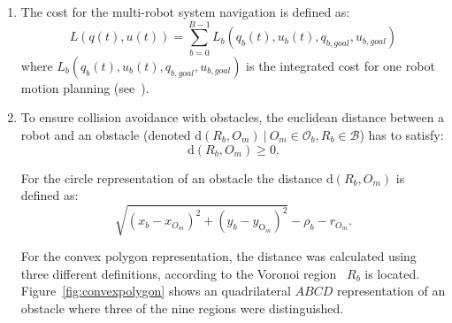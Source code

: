 \begin{enumerate}
    \item The cost for the multi-robot system navigation is defined as:
    \begin{equation}
        L(q(t),u(t)) = \sum_{b=0}^{B-1}L_b(q_b(t), u_b(t), q_{b,goal},u_{b,goal})
    \end{equation}
    where $L_b(q_b(t), u_b(t), q_{b,goal},u_{b,goal})$ is the 
    integrated cost for one robot
    motion planning (see~\cite{Defoort2009}).
    
    \item 
    To ensure collision avoidance with obstacles, the euclidean 
    distance between
    a robot and an obstacle (denoted $\mathrm{d}(R_b, O_m)\ |\ O_m
    \in \mathcal{O}_b, R_b \in \mathcal{B} $) has to satisfy:
    \begin{equation}
    	\mathrm{d}(R_b, O_m) \geq 0.
    \end{equation}
    
    For the circle representation of an obstacle the distance
    $\mathrm{d}(R_b, O_m)$ is defined as:
    \begin{equation*}
        \sqrt{(x_{b} - x_{O_m})^2 + (y_{b} - y_{\mathrm{O}_m})^2}  - \rho_b - r_{O_m}.
    \end{equation*}
    
    For the convex polygon representation, the distance was calculated
    using three different
    definitions, according to the Voronoi region~\cite{ericson2004real}
    $R_b$ is located.
    Figure~\ref{fig:convexpolygon} shows an
    quadrilateral $ABCD$ representation of an obstacle where three of the nine
    regions were distinguished. 


    
    
    
    

\end{enumerate}
